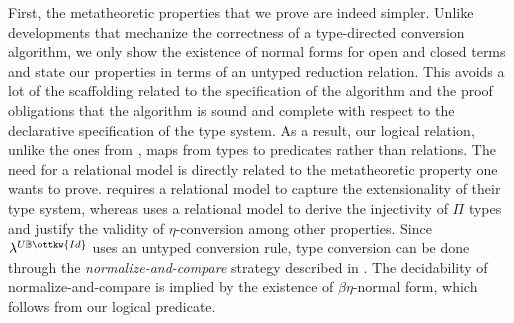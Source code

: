\documentclass[acmsmall,screen=true,
\ifpublic review=false\else,review=true\fi
  ,anonymous=\ifanonymous true\else false\fi]{acmart}
\newcommand{\lang}{$\lambda^{U\mathbb{B}\ottkw{Id}}$\xspace}
\newcommand{\scw}[1]{}
\newcommand{\yl}[1]{}
\begin{document}
First, the metatheoretic properties that we prove are indeed simpler.  Unlike
developments that mechanize the correctness of a type-directed conversion
algorithm, we only show the existence of normal forms for open and closed
terms and state our properties in terms of an untyped reduction relation. This
avoids a lot of the scaffolding related to the specification of the algorithm
and the proof obligations that the algorithm is sound and complete with
respect to the declarative specification of the type system.
As a result, our logical relation, unlike the ones from \citet{decagda,
  nbeincoq, martin-lof-a-la-coq, anand2014towards}, maps from types to
predicates rather than relations. \scw{How does this follow? Why do we need unary relations where they need binary relations?} The need for a relational model is
directly related to the metatheoretic property one wants to
prove. \citet{anand2014towards} requires a relational model to capture
the extensionality of their type system, whereas \citet{decagda,
  martin-lof-a-la-coq, nbeincoq} uses a relational model to derive the
injectivity of $\Pi$ types and justify the validity of
$\eta$-conversion among other properties.
Since \lang{} uses an untyped conversion rule, type conversion can be
done through the \emph{normalize-and-compare}
strategy described in \citet{pierce2004advanced}. The decidability of
normalize-and-compare is implied by the existence of
$\beta\eta$-normal form, which follows from our logical
predicate.

\scw{I'm getting confused by this paragraph. Does this reorganization sense:
  Our language is simpler than Nuprl, because it doesn't have extensional
  equality. It is simpler than Agda, because it doesn't have type-directed
  equality. Both of these cases require the definition of a binary logical
  relation, that defines a notion of semantic equality between terms. This
  relation justifies the injectivity of $\Pi$ types and justify the validity
  of $\eta$-conversion among other properties.}  \scw{Furthermore our proof is
  also simpler because we don't need prove the correctness of the NBE
  algorithm, which is used to show the decidability of Agda's type-directed
  equivalence. Therefore, we don't need to define this algorithm and show that
  it is sound and complete with respect to the type-directed
  equality. Instead, to show the decidability of our untyped equivalence, we
  need only show that terms have $\beta\eta$ normal forms. }
\yl{Makes perfect sense!}
\end{document}
